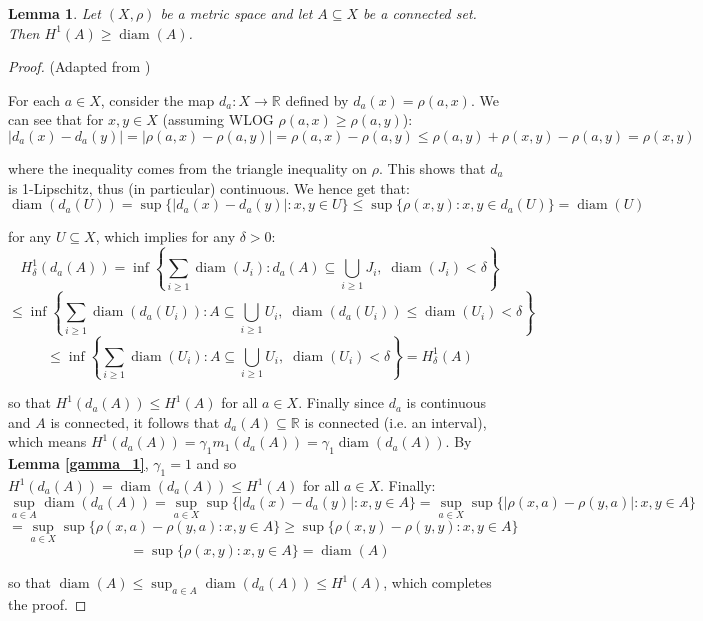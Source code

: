 \documentclass{article}[11pt]
\newcommand*{\R}{\mathbb{R}}
\DeclareMathOperator*{\diam}{diam}
\theoremstyle{dotless}
\newtheorem{lem}[thm]{Lemma}
\begin{document}
\begin{lem}\label{conn}
	Let $(X, \rho)$ be a metric space and let $A \subseteq X$ be a \textit{connected} set. Then $H^1(A) \geqslant \diam(A)$.
\end{lem}
\begin{proof}
	(Adapted from \cite{Sem})
	\bigskip
	
	\noindent
	For each $a \in X$, consider the map $d_a : X \to \R$ defined by $d_a(x) = \rho(a,x)$. We can see that for $x,y \in X$
	(assuming WLOG $\rho(a,x) \geqslant \rho(a,y)$):
	\[ |d_a(x) - d_a(y)| = |\rho(a,x) - \rho(a,y)| = \rho(a,x) - \rho(a,y) \leqslant \rho(a,y) + \rho(x,y) - \rho(a,y) = \rho(x,y) \]
	
	\noindent
	where the inequality comes from the triangle inequality on $\rho$. This shows that $d_a$ is 1-Lipschitz, thus (in particular) continuous. 
	We hence get that:
	\[ \diam(d_a(U)) = \sup\{ |d_a(x)-d_a(y)| : x,y \in U \} \leqslant \sup\{ \rho(x,y) : x,y \in d_a(U) \} = \diam(U) \]
	
	\noindent
	for any $U \subseteq X$, which implies for any $\delta > 0$:
	\[ H_\delta^1(d_a(A)) = \inf\left\{ \sum_{i \geqslant 1} \diam(J_i) : d_a(A) \subseteq \bigcup_{i \geqslant 1} J_i, \; \diam(J_i) < \delta \right\} \]
	\[ \leqslant \inf\left\{ \sum_{i \geqslant 1} \diam(d_a(U_i)) : A \subseteq \bigcup_{i \geqslant 1} U_i, \; \diam(d_a(U_i)) \leqslant 
	\diam(U_i) < \delta \right\} \]
	\[ \leqslant \inf\left\{ \sum_{i \geqslant 1} \diam(U_i) : A \subseteq \bigcup_{i \geqslant 1} U_i, \; \diam(U_i) < \delta \right\} 
	= H_\delta^1(A) \]
	
	\noindent
	so that $H^1(d_a(A)) \leqslant H^1(A)$ for all $a \in X$. Finally since $d_a$ is continuous and $A$ is connected, it follows that
	$d_a(A) \subseteq \R$ is connected (i.e. an interval), which means $H^1(d_a(A)) = \gamma_1 m_1(d_a(A)) = \gamma_1 \diam(d_a(A))$.
	By \textbf{Lemma \ref{gamma_1}}, $\gamma_1 = 1$ and so $H^1(d_a(A)) = \diam(d_a(A)) \leqslant H^1(A)$ for all $a \in X$.
	Finally:
	\[ \sup_{a \in A} \diam(d_a(A)) = \sup_{a \in X} \sup \{ |d_a(x)-d_a(y)| : x,y \in A \}
	= \sup_{a \in X} \sup \{ |\rho(x,a)-\rho(y,a)| : x,y \in A \} \]
	\[ = \sup_{a \in X} \sup \{ \rho(x,a)-\rho(y,a) : x,y \in A \} 
	\geqslant \sup \{ \rho(x,y)-\rho(y,y) : x,y \in A \}\]
	\[ = \sup \{ \rho(x,y) : x,y \in A \} = \diam(A)   \]

	\noindent
	so that $\diam(A) \leqslant \sup_{a \in A} \diam(d_a(A)) \leqslant H^1(A)$, which completes the proof.
\end{proof}
\end{document}

